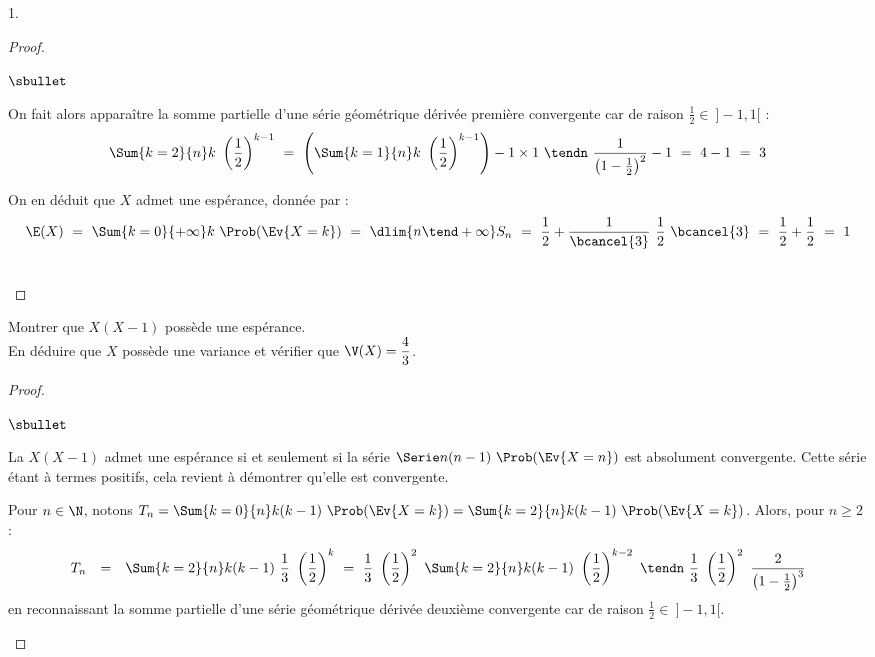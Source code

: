 \documentclass[11pt]{article}%
\begin{document}
\begin{noliste}{1.}
\begin{proof}
\begin{noliste}{$\sbullet$}
      \newpage


    \item On fait alors apparaître la somme partielle d'une série
      géométrique dérivée première convergente car de raison
      $\frac{1}{2} \in \ ]-1,1[$ :
      \[
      \Sum{k = 2}{n} k \ \left( \dfrac{1}{2} \right)^{k-1} \ = \
      \left( \Sum{k = 1}{n} k \ \left( \dfrac{1}{2} \right)^{k-1}
      \right) - 1 \times 1 \ \tendn \ \dfrac{1}{\left( 1 - \frac{1}{2}
        \right)^2} - 1 \ = \ 4 - 1 \ = \ 3
      \]

    \item On en déduit que $X$ admet une espérance, donnée par :
      \[
      \E(X) \ = \ \Sum{k=0}{+\infty} k \ \Prob(\Ev{X = k}) \ = \
      \dlim{n \tend +\infty} S_n \ = \ \dfrac{1}{2} +
      \dfrac{1}{\bcancel{3}} \ \dfrac{1}{2} \ \bcancel{3} \ = \
      \dfrac{1}{2} + \dfrac{1}{2} \ = \ 1
      \]
    \end{noliste}
    \conc{$\E(X) = 1$}~\\[-1.2cm]
  \end{proof}

\item Montrer que $X (X-1)$ possède une espérance. \\
  En déduire que $X$ possède une variance et vérifier que $\V(X) =
  \dfrac{4}{3}$.

  \begin{proof}~%
    \begin{noliste}{$\sbullet$}
    \item La \var $X(X-1)$ admet une espérance si et seulement si la
      série $\Serie n(n-1) \ \Prob(\Ev{X = n})$ est absolument
      convergente. Cette série étant à termes positifs, cela revient à
      démontrer qu'elle est convergente.

    \item Pour $n \in \N$, notons $T_n = \Sum{k = 0}{n} k(k-1) \
      \Prob(\Ev{X = k}) = \Sum{k = 2}{n} k(k-1) \ \Prob(\Ev{X =
        k})$. Alors, pour $n \geq 2$ :
      \[
      \begin{array}{rcl}
        T_n & = & \Sum{k = 2}{n} k(k-1) \ \dfrac{1}{3} \ \left(
          \dfrac{1}{2} \right)^k 
        \ = \ \dfrac{1}{3} \ \left(\dfrac{1}{2}
        \right)^2 \ \Sum{k =  2}{n} k(k-1) \ \left( \dfrac{1}{2}
        \right)^{k-2}
        \ \tendn \ \dfrac{1}{3} \ \left(\dfrac{1}{2}
        \right)^2 \ \dfrac{2}{\left(1 - \frac{1}{2} \right)^3}
      \end{array}
      \]
      en reconnaissant la somme partielle d'une série géométrique
      dérivée deuxième convergente car de raison $\frac{1}{2} \in \
      ]-1,1[$.


\end{noliste}
\end{proof}
\end{noliste}
\end{document}
